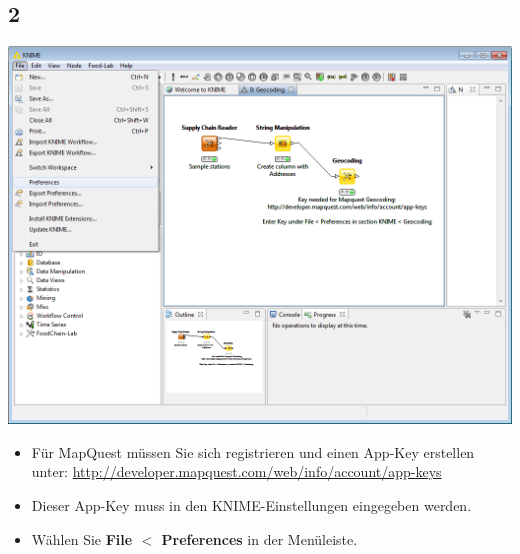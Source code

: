 \documentclass{beamer}
\begin{document}
\subsection{2}
\begin{frame}
	\begin{center}
  		\includegraphics[height=0.6\textheight]{2.png}
	\end{center}
	\begin{itemize}		
		\item Für MapQuest müssen Sie sich registrieren und einen App-Key erstellen unter: \url{http://developer.mapquest.com/web/info/account/app-keys}
		\item Dieser App-Key muss in den KNIME-Einstellungen eingegeben werden.
		\item Wählen Sie \textbf{File $<$ Preferences} in der Menüleiste.
	\end{itemize}
\end{frame}
\end{document}
